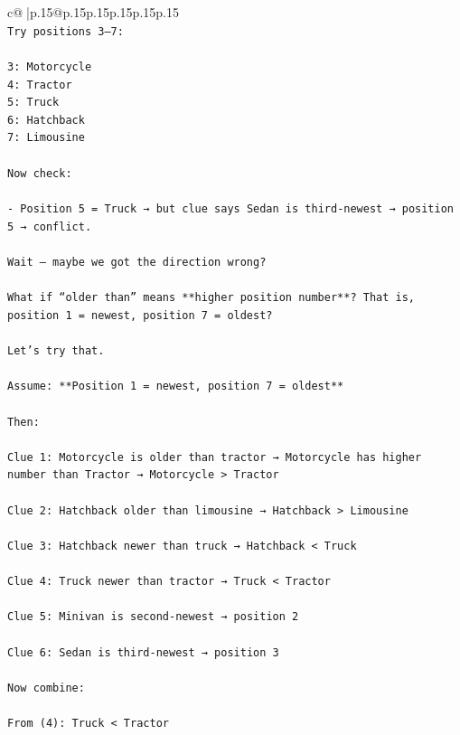 \documentclass{article}
\begin{document}
{\begin{supertabular}{c@{$\;$}|p{.15\linewidth}@{}p{.15\linewidth}p{.15\linewidth}p{.15\linewidth}p{.15\linewidth}p{.15\linewidth}}
{{{\\ 
\texttt{Try positions 3–7:} \\
\\ 
\texttt{3: Motorcycle  } \\
\texttt{4: Tractor  } \\
\texttt{5: Truck  } \\
\texttt{6: Hatchback  } \\
\texttt{7: Limousine} \\
\\ 
\texttt{Now check:} \\
\\ 
\texttt{{-} Position 5 = Truck → but clue says Sedan is third{-}newest → position 5 → conflict.} \\
\\ 
\texttt{Wait — maybe we got the direction wrong?} \\
\\ 
\texttt{What if “older than” means **higher position number**? That is, position 1 = newest, position 7 = oldest?} \\
\\ 
\texttt{Let’s try that.} \\
\\ 
\texttt{Assume: **Position 1 = newest, position 7 = oldest**} \\
\\ 
\texttt{Then:} \\
\\ 
\texttt{Clue 1: Motorcycle is older than tractor → Motorcycle has higher number than Tractor → Motorcycle > Tractor} \\
\\ 
\texttt{Clue 2: Hatchback older than limousine → Hatchback > Limousine} \\
\\ 
\texttt{Clue 3: Hatchback newer than truck → Hatchback < Truck} \\
\\ 
\texttt{Clue 4: Truck newer than tractor → Truck < Tractor} \\
\\ 
\texttt{Clue 5: Minivan is second{-}newest → position 2} \\
\\ 
\texttt{Clue 6: Sedan is third{-}newest → position 3} \\
\\ 
\texttt{Now combine:} \\
\\ 
\texttt{From (4): Truck < Tractor  } \\
}}}
\end{supertabular}}
\end{document}

